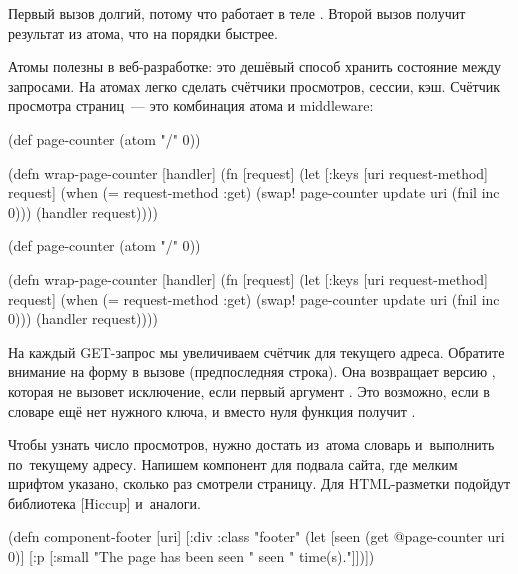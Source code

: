 Первый вызов долгий, потому что работает  в теле
. Второй вызов получит результат из атома, что на порядки быстрее.


Атомы полезны в веб-разработке: это дешёвый способ хранить состояние между
запросами. На атомах легко сделать счётчики просмотров, сессии, кэш. Счётчик
просмотра страниц~--- это комбинация атома и middleware:

\ifnarrow

\begin{clojure}
(def page-counter
  (atom {"/" 0}))

(defn wrap-page-counter
  [handler]
  (fn [request]
    (let [{:keys [uri request-method]}
          request]
      (when (= request-method :get)
        (swap! page-counter
          update uri (fnil inc 0)))
      (handler request))))
\end{clojure}

\else

\begin{clojure}
(def page-counter
  (atom {"/" 0}))

(defn wrap-page-counter
  [handler]
  (fn [request]
    (let [{:keys [uri request-method]} request]
      (when (= request-method :get)
        (swap! page-counter update uri (fnil inc 0)))
      (handler request))))
\end{clojure}

\fi


На каждый GET-запрос мы увеличиваем счётчик для текущего адреса. Обратите
внимание на форму  в вызове  (предпоследняя строка). Она
возвращает версию , которая не вызовет исключение, если первый
аргумент . Это возможно, если в словаре ещё нет нужного ключа, и
вместо нуля функция получит .


Чтобы узнать число просмотров, нужно достать из~атома словарь и~выполнить
 по~текущему адресу. Напишем компонент для подвала сайта, где мелким
шрифтом указано, сколько раз смотрели страницу. Для HTML-разметки подойдут
библиотека [Hiccup]
и~аналоги.

\ifnarrow

\begin{clojure}
(defn component-footer [uri]
  [:div {:class "footer"}
   (let [seen (get @page-counter uri 0)]
     [:p [:small
          "The page has been seen " seen
          " time(s)."]])])
\end{clojure}

